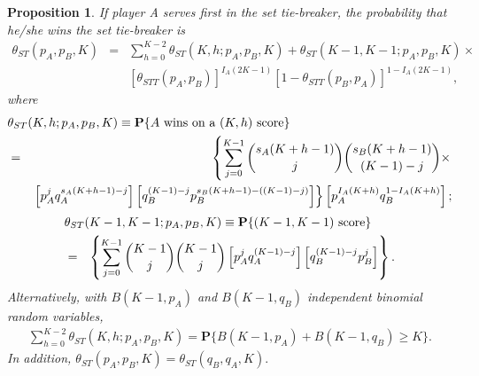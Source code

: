 \documentclass[10pt,a4paper]{amsart}
\newtheorem{proposition}{Proposition}
\renewcommand{\Pr}{\mathbf{P}}
\begin{document}
\begin{proposition}
\label{prop: set tie-breaker probs}
    If player A serves first in the set tie-breaker, the probability that he/she wins the set tie-breaker is
    \begin{eqnarray*}
    \theta_{ST}(p_A,p_B,K)  & = &  \sum_{h=0}^{K-2} \theta_{ST}(K,h;p_A,p_B,K) + 
     \theta_{ST}(K-1,K-1;p_A,p_B,K) \times \\ &&
     [\theta_{STT}(p_A,p_B)]^{I_A(2K-1)} [1-\theta_{STT}(p_B,p_A)]^{1-I_A(2K-1)},
    \end{eqnarray*}
    where
    \begin{eqnarray*}
   \lefteqn{     \theta_{ST}(K,h;p_A,p_B,K) \equiv  \Pr\{\mbox{$A$ wins on a $(K,h)$ score}\}  } \\ & = & \left\{
        \sum_{j=0}^{K-1} {s_A(K+h-1) \choose j} {s_B(K+h-1) \choose {(K-1) - j}} \times \right. \\
        && \left.
        \left[p_A^j q_A^{s_A(K+h-1) - j}\right]
        \left[q_B^{(K-1)-j} p_B^{s_B(K+h-1) - ((K-1)-j)}\right]
        \right\}  \left[p_A^{I_A(K+h)} q_B^{1-I_A(K+h)}\right];
    \end{eqnarray*}
    \begin{eqnarray*}
   \lefteqn{  \theta_{ST}(K-1,K-1;p_A,p_B,K)  \equiv   \Pr\{(K-1,K-1)\ \mbox{score}\} } \\ & = &
       \left\{
        \sum_{j=0}^{K-1} {{K-1} \choose j} {{K-1} \choose {j}}
        \left[p_A^j q_A^{(K-1) - j}\right]
        \left[q_B^{(K-1)-j} p_B^{j}\right]
        \right\}.
    \end{eqnarray*}
    Alternatively, with $B(K-1,p_A)$ and $B(K-1,q_B)$ independent binomial random variables,
    \begin{eqnarray*}
        \sum_{h=0}^{K-2} \theta_{ST}(K,h;p_A,p_B,K) =
        \Pr\{B(K-1,p_A) + B(K-1,q_B) \ge K\}.
    \end{eqnarray*}
In addition,
    $\theta_{ST}(p_A,p_B,K) = \theta_{ST}(q_B,q_A,K).$
\end{proposition}
\end{document}
